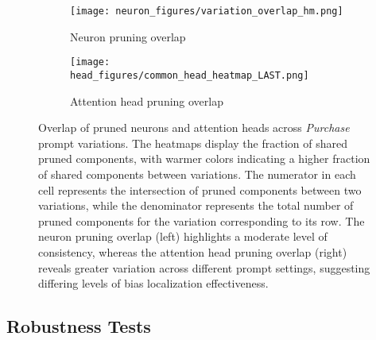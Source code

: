
\begin{figure}[t]
  \centering
  \begin{subfigure}[b]{0.49\linewidth}
      \centering
      \texttt{[image: neuron\_figures/variation\_overlap\_hm.png]}
      \caption{Neuron pruning overlap}
      \label{fig-hm-vars-neuron}
  \end{subfigure}
  \hfill
  \begin{subfigure}[b]{0.49\linewidth}
      \centering
      \texttt{[image: head\_figures/common\_head\_heatmap\_LAST.png]}
      \caption{Attention head pruning overlap}
      \label{fig-hm-vars-head}
  \end{subfigure}
  \caption{Overlap of pruned neurons and attention heads across \textit{Purchase} prompt variations. 
  The heatmaps display the fraction of shared pruned components, with warmer colors indicating a higher fraction of shared components between variations.
  The numerator in each cell represents the intersection of pruned components between two variations, while the denominator represents the total number of pruned components for the variation corresponding to its row. 
  The neuron pruning overlap (left) highlights a moderate level of consistency, whereas the attention head pruning overlap (right) reveals greater variation across different prompt settings, suggesting differing levels of bias localization effectiveness.}
  \label{fig-hm-vars-combined}
\end{figure}

\subsection{Robustness Tests}
\label{app-robustness}

